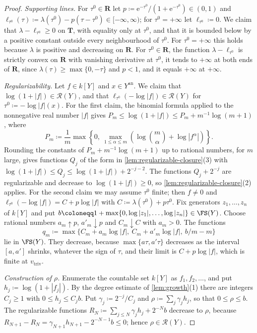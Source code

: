 \documentclass[11pt,a4paper]{article}
\newcommand{\an}{\mathrm{an}}          %
\newcommand{\vtriv}{v_{\mathrm{triv}}} %
\begin{document}
\begin{proof}
\emph{Supporting lines.} For $\tau^0\in\mathbf R$ let $p\coloneqq\mathrm e^{-\tau^0}/(1+\mathrm e^{-\tau^0})\in(0,1)$ and $\ell_{\tau^0}(\tau)\coloneqq\lambda(\tau^0)-p(\tau-\tau^0)\in[-\infty,\infty)$; for $\tau^0=+\infty$ let $\ell_{\tau^0}\coloneqq0$. We claim that $\lambda-\ell_{\tau^0}\ge0$ on $\mathbf T$, with equality only at $\tau^0$, and that it is bounded below by a positive constant outside every neighbourhood of $\tau^0$. For $\tau^0=+\infty$ this holds because $\lambda$ is positive and decreasing on $\mathbf R$. For $\tau^0\in\mathbf R$, the function $\lambda-\ell_{\tau^0}$ is strictly convex on $\mathbf R$ with vanishing derivative at $\tau^0$, it tends to $+\infty$ at both ends of $\mathbf R$, since $\lambda(\tau)\ge\max\{0,-\tau\}$ and $p<1$, and it equals $+\infty$ at $+\infty$.

\emph{Regularizability.} Let $f\in k[Y]$ and $x\in Y^{\an}$. We claim that $\log(1+|f|)\in\mathcal{R}(Y)$, and that $\ell_{\tau^0}(-\log|f|)\in\mathcal{R}(Y)$ for $\tau^0\coloneqq-\log|f|(x)$. For the first claim, the binomial formula applied to the nonnegative real number $|f|$ gives $P_m\le\log(1+|f|)\le P_m+m^{-1}\log(m+1)$, where
\[
P_m\coloneqq\frac1m\max\left\{0,\ \max_{1\le\alpha\le m}\left(\log\binom m\alpha+\log|f^\alpha|\right)\right\}.
\]
Rounding the constants of $P_m+m^{-1}\log(m+1)$ up to rational numbers, for $m$ large, gives functions $Q_j$ of the form in \cref{lem:regularizable-closure}(3) with $\log(1+|f|)\le Q_j\le\log(1+|f|)+2^{-j-2}$. The functions $Q_j+2^{-j}$ are regularizable and decrease to $\log(1+|f|)\ge0$, so \cref{lem:regularizable-closure}(2) applies. For the second claim we may assume $\tau^0$ finite; then $f\ne0$ and $\ell_{\tau^0}(-\log|f|)=C+p\log|f|$ with $C\coloneqq\lambda(\tau^0)+p\tau^0$. Fix generators $z_1,\ldots,z_n$ of $k[Y]$ and put $b\coloneqq1+\max\{0,\log|z_1|,\ldots,\log|z_n|\}\in\FS(Y)$. Choose rational numbers $a_m\uparrow p$, $a'_m\downarrow p$ and $C_m\downarrow C$ with $a_m>0$. The functions
\[
q_m\coloneqq\max\bigl\{C_m+a_m\log|f|,\ C_m+a'_m\log|f|,\ b/m-m\bigr\}
\]
lie in $\FS(Y)$. They decrease, because $\max\{a\tau,a'\tau\}$ decreases as the interval $[a,a']$ shrinks, whatever the sign of $\tau$, and their limit is $C+p\log|f|$, which is finite at $\vtriv$.

\emph{Construction of $\rho$.} Enumerate the countable set $k[Y]$ as $f_1,f_2,\ldots$, and put $h_j\coloneqq\log(1+|f_j|)$. By the degree estimate of \cref{lem:growth}(1) there are integers $C_j\ge1$ with $0\le h_j\le C_jb$. Put $\gamma_j\coloneqq2^{-j}/C_j$ and $\rho\coloneqq\sum_j\gamma_jh_j$, so that $0\le\rho\le b$. The regularizable functions $R_N\coloneqq\sum_{j\le N}\gamma_jh_j+2^{-N}b$ decrease to $\rho$, because $R_{N+1}-R_N=\gamma_{N+1}h_{N+1}-2^{-N-1}b\le0$; hence $\rho\in\mathcal{R}(Y)$.


\end{proof}
\end{document}
